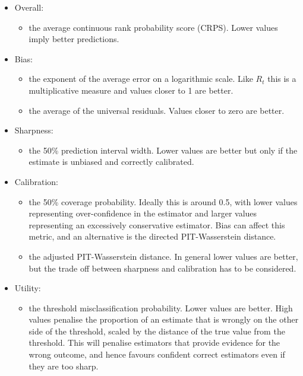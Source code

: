 \documentclass[a4paper, 12pt, twoside]{article}
\begin{document}
\begin{itemize}
 \item Overall:
 \begin{itemize}
  \item the average continuous rank probability score (CRPS). Lower values imply better predictions.
 \end{itemize}
 \item Bias:
 \begin{itemize}
  \item the exponent of the average error on a logarithmic scale. Like $R_t$ this is a multiplicative measure and values closer to 1 are better.
  \item the average of the universal residuals. Values closer to zero are better.
 \end{itemize}
 \item Sharpness:
 \begin{itemize}
  \item the 50\% prediction interval width. Lower values are better but only if the estimate is unbiased and correctly calibrated.
 \end{itemize}
 \item Calibration:
  \begin{itemize}
  \item the 50\% coverage probability. Ideally this is around 0.5, with lower values representing over-confidence in the estimator and larger values representing an excessively conservative estimator. Bias can affect this metric, and an alternative is the directed PIT-Wasserstein distance.
  \item the adjusted PIT-Wasserstein distance. In general lower values are better, but the trade off between sharpness and calibration has to be considered.
  \end{itemize}
 \item Utility:
  \begin{itemize}
  \item the threshold misclassification probability. Lower values are better. High values penalise the proportion of an estimate that is wrongly on the other side of the threshold, scaled by the distance of the true value from the threshold. This will penalise estimators that provide evidence for the wrong outcome, and hence favours confident correct estimators even if they are too sharp.
  \end{itemize}
\end{itemize}


\end{document}
